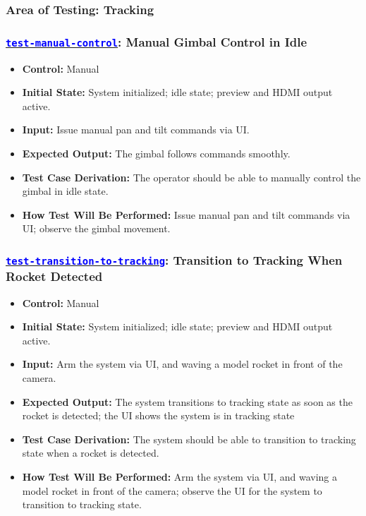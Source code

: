 \documentclass[12pt, titlepage]{article}
\newcommand{\tid}[1]{\hyperlink{tid:#1}{\textcolor{blue}{\texttt{#1}}}}
\begin{document}
\subsubsection{Area of Testing: Tracking}

\subsubsection*{\tid{test-manual-control}: Manual Gimbal Control in Idle}
\begin{itemize}
  \item \textbf{Control:} Manual
  \item \textbf{Initial State:} System initialized; idle state; preview and HDMI output active.
  \item \textbf{Input:} Issue manual pan and tilt commands via UI.
  \item \textbf{Expected Output:} The gimbal follows commands smoothly.
  \item \textbf{Test Case Derivation:} The operator should be able to manually control the gimbal in idle state.
  \item \textbf{How Test Will Be Performed:} Issue manual pan and tilt commands via UI; observe the gimbal movement.
\end{itemize}

\subsubsection*{\tid{test-transition-to-tracking}: Transition to Tracking When Rocket Detected}
\begin{itemize}
  \item \textbf{Control:} Manual
  \item \textbf{Initial State:} System initialized; idle state; preview and HDMI output active.
  \item \textbf{Input:} Arm the system via UI, and waving a model rocket in front of the camera.
  \item \textbf{Expected Output:} The system transitions to tracking state as soon as the rocket is detected; the UI shows the system is in tracking state
  \item \textbf{Test Case Derivation:} The system should be able to transition to tracking state when a rocket is detected.
  \item \textbf{How Test Will Be Performed:} Arm the system via UI, and waving a model rocket in front of the camera; observe the UI for the system to transition to tracking state.
\end{itemize}
\end{document}

